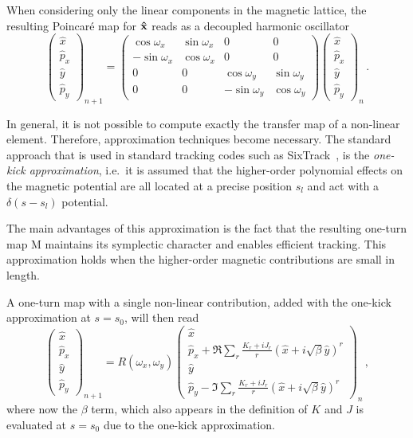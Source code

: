 When considering only the linear components in the magnetic lattice, the resulting Poincaré map for $\vb{\hat x}$ reads as a decoupled harmonic oscillator
%
\begin{equation} 
	\begin{pmatrix}
		\hat x \\ \hat p_x \\ \hat y \\ \hat p_y 
	\end{pmatrix}_{n+1}
	=
	\begin{pmatrix}
		\cos\omega_x & \sin\omega_x & 0 & 0 \\
		-\sin\omega_x & \cos\omega_x & 0 & 0 \\
		0 & 0 &\cos\omega_y & \sin\omega_y \\
		0 & 0 &-\sin\omega_y & \cos\omega_y
	\end{pmatrix}
	\begin{pmatrix}
		\hat x \\ \hat p_x \\ \hat y \\ \hat p_y 
	\end{pmatrix}_{n}\,.
\end{equation}

In general, it is not possible to compute exactly the transfer map of a non-linear element. Therefore, approximation techniques become necessary. The standard approach that is used in standard tracking codes such as SixTrack~\cite{sixtrack}, is the \textit{one-kick approximation}, i.e.\ it is assumed that the higher-order polynomial effects on the magnetic potential are all located at a precise position $s_l$ and act with a $\delta(s - s_l)$ potential.

The main advantages of this approximation is the fact that the resulting one-turn map $\mathrm{M}$ maintains its symplectic character and enables efficient tracking. This approximation holds when the higher-order magnetic contributions are small in length.

A one-turn map with a single non-linear contribution, added 
with the one-kick approximation at $s = s_0$, will then read  
\begin{equation}
	\begin{pmatrix}
		\hat x \\ \hat p_x \\ \hat y \\ \hat p_y 
	\end{pmatrix}_{n+1}
	=
	R(\omega_x,\omega_y)
	\begin{pmatrix}
		\hat x \\ \hat p_x + \Re \sum_r\frac{K_r + iJ_r}{r}(\hat x+ i\sqrt{\beta}\hat y)^r \\ \hat y \\ \hat p_y - \Im \sum_r\frac{K_r + iJ_r}{r}(\hat x+ i\sqrt{\beta}\hat y)^r  
	\end{pmatrix}_{n}\,,
\end{equation}
where now the $\beta$ term, which also appears in the definition of $K$ and $J$ is evaluated at $s=s_0$ due to the one-kick approximation.

